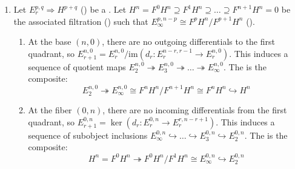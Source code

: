 \begin{definition}
\begin{enumerate}
    \item Let $E_r^{p,q} \Rightarrow H^{p+q}$ () be a   . Let $H^n = F^0 H^n \supseteq F^1 H^n \supseteq \dots \supseteq F^{n+1} H^n = 0$ be the associated filtration () such that $E_\infty^{p,n-p} \cong F^p H^n / F^{p+1} H^n$ ().
    \begin{enumerate}
        \item At the base $(n,0)$, there are no outgoing differentials to the first quadrant, so $E_{r+1}^{n,0} = E_r^{n,0} / \text{im}(d_r: E_r^{n-r, r-1} \to E_r^{n,0})$. This induces a sequence of quotient maps $E_2^{n,0} \twoheadrightarrow E_3^{n,0} \twoheadrightarrow \dots \twoheadrightarrow E_\infty^{n,0}$. The  is the composite:
        $$E_2^{n,0} \twoheadrightarrow E_\infty^{n,0} \cong F^n H^n / F^{n+1} H^n \cong F^n H^n \hookrightarrow H^n$$

        \item At the fiber $(0,n)$, there are no incoming differentials from the first quadrant, so $E_{r+1}^{0,n} = \ker(d_r: E_r^{0,n} \to E_r^{r, n-r+1})$. This induces a sequence of subobject inclusions $E_\infty^{0,n} \hookrightarrow \dots \hookrightarrow E_3^{0,n} \hookrightarrow E_2^{0,n}$. The  is the composite:
        $$H^n = F^0 H^n \twoheadrightarrow F^0 H^n / F^1 H^n \cong E_\infty^{0,n} \hookrightarrow E_2^{0,n}$$
    \end{enumerate}
\end{enumerate}
\end{definition}